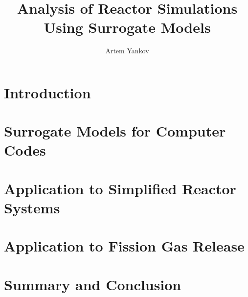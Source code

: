 \documentclass[thesis]{thesis-umich}
\title{Analysis of Reactor Simulations Using Surrogate Models}
\author{Artem Yankov}
\begin{document}
\chapter{Introduction}   \label{chap:intro}


\chapter{Surrogate Models for Computer Codes} \label{chap:rom}


\chapter{Application to Simplified Reactor Systems} \label{chap:applications}


%

\chapter{Application to Fission Gas Release} \label{chap:fgr}


\chapter{Summary and Conclusion} \label{chap:conclusion}




\end{document}
